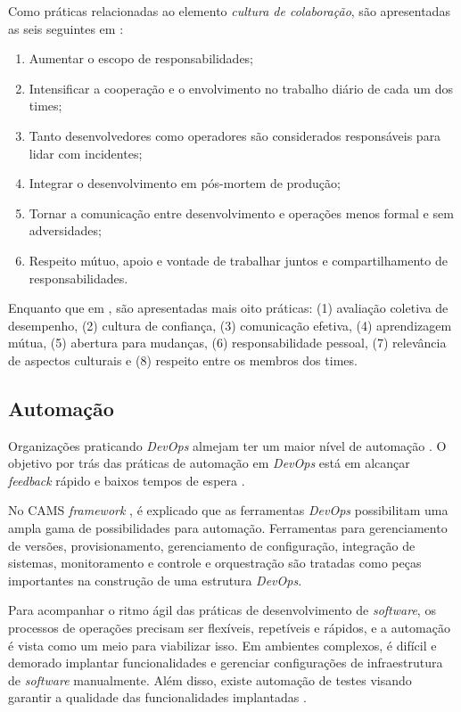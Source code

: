 Como práticas relacionadas ao elemento \emph{cultura de colaboração}, são
apresentadas as seis seguintes em \cite{extending_dimensions}:

\begin{enumerate}
\item Aumentar o escopo de responsabilidades;
\item Intensificar a cooperação e o envolvimento no trabalho diário de cada um
dos times;
\item Tanto desenvolvedores como operadores são considerados responsáveis para
lidar com incidentes;
\item Integrar o desenvolvimento em pós-mortem de produção;
\item Tornar a comunicação entre desenvolvimento e operações menos formal e
sem adversidades;
\item Respeito mútuo, apoio e vontade de trabalhar juntos e compartilhamento
de responsabilidades.
\end{enumerate}

Enquanto que em \cite{characterizing_devops}, são apresentadas mais oito
práticas: (1) avaliação coletiva de desempenho, (2) cultura de confiança, (3)
comunicação efetiva, (4) aprendizagem mútua, (5) abertura para mudanças, (6)
responsabilidade pessoal, (7) relevância de aspectos culturais e (8) respeito
entre os membros dos times.

\subsection{Automação}

Organizações praticando \textit{DevOps} almejam ter um maior nível de automação
\cite{qualitative_devops_journalsw_17}. O objetivo por trás das práticas de
automação em {\it DevOps} está em alcançar {\it feedback} rápido e baixos
tempos de espera \cite{challenges_in_adopting_devops}.

No \acrshort{CAMS} \textit{framework} \cite{what_devops_means_2010}, é explicado
que as ferramentas \textit{DevOps} possibilitam uma ampla gama de possibilidades
para automação. Ferramentas para gerenciamento de versões, provisionamento,
gerenciamento de configuração, integração de sistemas, monitoramento e controle
e orquestração são tratadas como peças importantes na construção de uma
estrutura \textit{DevOps}.

Para acompanhar o ritmo ágil das práticas de desenvolvimento de \textit{software}, os
processos de operações precisam ser flexíveis, repetíveis e rápidos, e a
automação é vista como um meio para viabilizar isso. Em ambientes complexos,
é difícil e demorado implantar funcionalidades e gerenciar configurações de
infraestrutura de \textit{software} manualmente. Além disso, existe automação
de testes visando garantir a qualidade das funcionalidades implantadas
\cite{dimensions_of_devops,extending_dimensions}.

